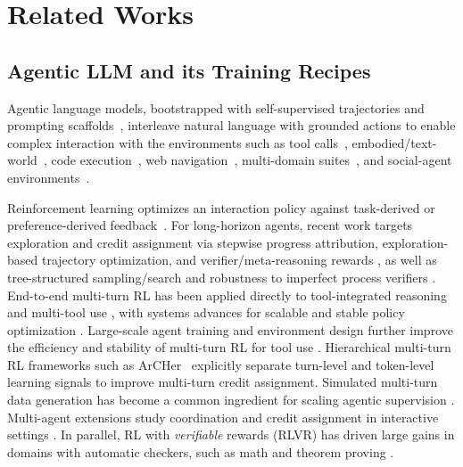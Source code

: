 \section{Related Works}
\label{sec:related}

\subsection{Agentic LLM and its Training Recipes}
Agentic language models, bootstrapped with self-supervised trajectories and prompting scaffolds~\citep{yao2023react,schick2023toolformer}, interleave natural language with grounded actions to enable complex interaction with the environments such as tool calls~\citep{xu2023toolbench,qin2023toolllm}, embodied/text-world~\citep{shridhar2020alfworld,wang2022scienceworld}, code execution~\citep{jimenez2024swe,wang2025openhandsopenplatformai,pan2025trainingsoftwareengineeringagents}, web navigation~\citep{yao2022webshop, wei2025browsecompsimplechallengingbenchmark}, multi-domain suites~\citep{ma2024agentboard}, and social-agent environments~\citep{wang2024sotopiapi}.

Reinforcement learning optimizes an interaction policy against task-derived or preference-derived feedback~\citep{ouyang2022training,schulman2017ppo,schulman2015trpo}.
For long-horizon agents, recent work targets exploration and credit assignment via stepwise progress attribution, exploration-based trajectory optimization, and verifier/meta-reasoning rewards \citep{wang2025sparl,song2024trialerror,zhang2025rlvmr}, as well as tree-structured sampling/search and robustness to imperfect process verifiers \citep{ji2025treesearchllmrl,rohatgi2025tamingprocessverifiers}.
End-to-end multi-turn RL has been applied directly to tool-integrated reasoning and multi-tool use \citep{xue2025simpletir,dong2025toolstar}, with systems advances for scalable and stable policy optimization \citep{yang2025dcpo,yu2025dapoopensourcellmreinforcement}.
Large-scale agent training and environment design further improve the efficiency and stability of multi-turn RL for tool use \citep{luo2025agentlightningtrainai,dong2025agenticreinforcedpolicyoptimization,su2025toolorchestra}.
Hierarchical multi-turn RL frameworks such as ArCHer~\citep{zhou2024archer} explicitly separate turn-level and token-level learning signals to improve multi-turn credit assignment.
Simulated multi-turn data generation has become a common ingredient for scaling agentic supervision \citep{prabhakar2025apigenmtagenticpipelinemultiturn}.
Multi-agent extensions study coordination and credit assignment in interactive settings \citep{zhou2025sweetrl,xi2025agentgymrl}.
In parallel, RL with \emph{verifiable} rewards (RLVR) has driven large gains in domains with automatic checkers, such as math and theorem proving \citep{shao2024deepseekmath,xin2024deepseekproverv15harnessingproofassistant,Guo_2025}.

